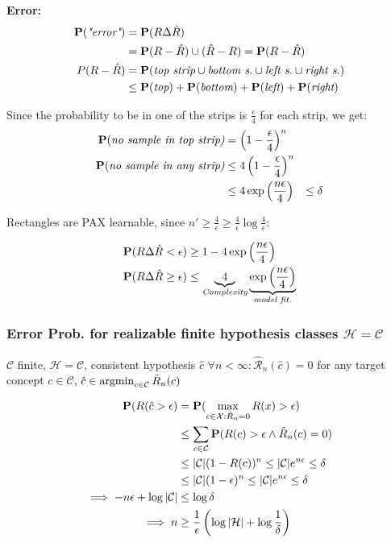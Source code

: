 \textbf{Error: }
\begin{align*}
	\P(\textit{"error"}) 	&= \P(R\Delta\hat R) \\
							&= \P(R - \hat R)\cup (\hat R - R) = \P(R - \hat R)\\
	P(R - \hat R) 			&= \P(\textit{top strip} \cup \textit{bottom s.} \cup \textit{left s.} \cup \textit{right s.}) \\
							&\leq \P(\textit{top}) + \P(\textit{bottom}) + \P(\textit{left}) + \P(\textit{right}) 
\end{align*}

Since the probability to be in one of the strips is $\frac{\epsilon}{4}$ for each strip, we get:
\begin{align*}
	\P(\textit{no sample in top strip)} &= \left(1-\frac{\epsilon}{4}\right)^n \\
	\P(\textit{no sample in any strip)} &\leq 4\left(1-\frac{\epsilon}{4}\right)^n \\
										&\leq 4\exp\left(\frac{n\epsilon}{4} \right)
										&\leq \delta
\end{align*}

Rectangles are PAX learnable, since $n'\geq \frac{4}{\epsilon}\geq \frac{4}{\epsilon}\log\frac{4}{\epsilon}$: 

\begin{align*}
		\P(R\Delta \hat R < \epsilon) &\geq 1 - 4\exp\left(\frac{n\epsilon}{4} \right) \\
		\P(R\Delta \hat R \geq \epsilon) &\leq \underbrace{4}_{\textit{Complexity}}\underbrace{\exp\left(\frac{n\epsilon}{4} \right)}_{\textit{model fit.}} \\
\end{align*}

\subsubsection{Error Prob. for realizable finite hypothesis classes $\mathcal H = \mathcal C$}

$\mathcal C$ finite, $\mathcal H = \mathcal C$, consistent hypothesis $\hat c$ $\forall n< \infty: \hat{\mathcal R}_n(\hat c) = 0$ for any target concept $c\in \mathcal C$, $\hat c\in\argmin_{c\in\mathcal C} \hat R_n(c)$

\begin{align*}
	\P(R(\hat c > \epsilon) &= \P(\max_{c\in\mathcal X:\hat R_n=0} R(x) > \epsilon) \\
							&\leq \sum_{c\in\mathcal C} \P(R(c) > \epsilon\land \hat R_n(c) = 0) \\
							&\leq |\mathcal C|(1-R(c))^n \leq |\mathcal C|e^{n\epsilon} \leq \delta \\
							&\leq |\mathcal C|(1-\epsilon)^n \leq |\mathcal C|e^{n\epsilon} \leq \delta \\
	\implies -n\epsilon + \log|\mathcal C| &\leq \log\delta \\
	\implies n&\geq \frac{1}{\epsilon}\left(\log|\mathcal H| + \log\frac{1}{\delta} \right)
\end{align*}

